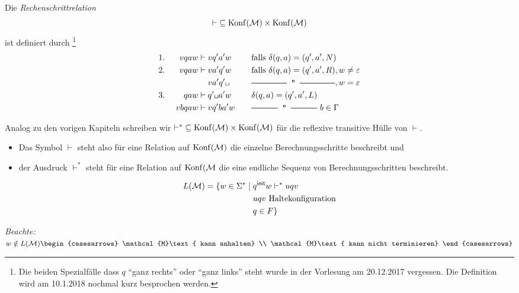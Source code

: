 \begin{Def}[name={[Rechenschrittrelation]}] %
	Die \emph{Rechenschrittrelation}
	\[ {\vdash} \subseteq \operatorname{Konf}(\mathcal{M})\times\operatorname{Konf}(\mathcal{M}) \]
	ist definiert durch
	\footnote{Die beiden Spezialfälle dass $q$ ``ganz rechts'' oder ``ganz links'' steht wurde in der Vorlesung am 20.12.2017 vergessen. Die Definition wird am 10.1.2018 nochmal kurz besprochen werden.}
	\begin{alignat*}{3}
		1.&\ & v qaw &\vdash v q'a'w &\quad& \text{falls }\delta(q,a)=(q',a',N)\\
		2.&& v qaw &\vdash v a'q'w && \text{falls }\delta(q,a)=(q',a',R), w\neq \Eps\\
		&&&\phantom{{}\vdash{}} v a'q'\blank && \ruleplaceholder{\widthof{falls $\delta(q,a)=(q',a',R)$}}, w=\Eps\\
		3.&& qaw &\vdash q'\blank a'w && \delta(q,a)=(q',a',L)\\
		&& vbqaw &\vdash vq'ba'w && \ruleplaceholder{\widthof{$\delta(q,a)=(q',a',L)$}}\  b\in\Gamma
	\end{alignat*}
\end{Def}
Analog zu den vorigen Kapiteln schreiben wir
	${\vdash^*} \subseteq \operatorname{Konf}(\mathcal{M}) \times \operatorname{Konf}(\mathcal{M})$ 
	für die reflexive transitive Hülle von $\vdash$.
\begin{itemize}
 \item Das Symbol $\vdash$ steht also für eine Relation auf $\operatorname{Konf}(\mathcal{M})$ die einzelne Berechnungsschritte beschreibt und
 \item der Ausdruck $\vdash^*$ steht für eine Relation auf $\operatorname{Konf}(\mathcal{M}$ die eine endliche Sequenz von  Berechnungsschritten beschreibt.
\end{itemize}

 
%
%
\begin{Def} %
	\begin{align*}
		L(\mathcal{M})=\{ w\in\Sigma^* \mid{}
		& q^\mathsf{init} w \vdash^*uqv\\
		&uqv \text{ Haltekonfiguration}\\
		&q\in F\}
	\end{align*}
\end{Def}
\emph{Beachte:}
$w\notin L(\mathcal{M})\begin{casesarrows}
\mathcal{M}\text{ kann anhalten}          \\
\mathcal{M}\text{ kann nicht terminieren}
\end{casesarrows}$

